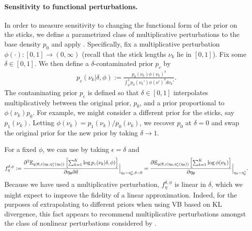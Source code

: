 

\paragraph{Sensitivity to functional perturbations.}
%
In order to measure sensitivity to changing the functional form of the prior on
the sticks, we define a parametrized class of multiplicative perturbations to
the base density $p_{0}$ and apply .
Specifically, fix a multiplicative perturbation $\phi(\cdot): [0, 1] \rightarrow
(0, \infty)$ (recall that the stick lengths $\nu_k$  lie in $[0, 1]$). Fix some
$\delta\in[0, 1]$.  We then define a $\delta$-contaminated prior $p_c$ by
%
\begin{align}
\label{eq:expon_perturb}
	p_c(\nu_k \vert \delta, \phi) :=
  \frac{p_{0}(\nu_k)\phi(\nu_k)^\delta}
       {\int_0^1 p_0(\nu_k')\phi(\nu')^\delta d\nu_k'}.
\end{align}
%
The contaminating prior $p_c$ is defined so that $\delta\in[0, 1]$
interpolates multiplicatively between the original prior, $p_{0}$, and a prior
proportional to $\phi(\nu_k)p_{0}$. For example, we might consider a different
prior for the sticks, say $p_1(\nu_k)$.  Letting $\phi(\nu_k) = p_1(\nu_k) /
p_{0}(\nu_k)$, we recover $p_{0}$ at $\delta = 0$ and swap the original
prior for the new prior by taking $\delta \rightarrow 1$.

For a fixed $\phi$, we can use  by taking
$\epsilon = \delta$ and
%
\begin{align*}
f^{\delta,\phi}_\eta :=
\frac{\partial^2
    \mathbb{E}_{q\left(\theta, z \vert \eta_\theta, \eta_z^{*}(\eta_\theta)\right)} \left[ \sum_{k=1}^K \log p_c(\nu_k \vert \delta, \phi) \right]}
{\partial \eta_\theta \partial \delta}
    \Big\rvert_{\eta_\theta = \eta_\theta^{*}, \delta = 0} =
\frac{\partial
    \mathbb{E}_{q\left(\theta, z \vert \eta_\theta, \eta_z^{*}(\eta_\theta)\right)} \left[ \sum_{k=1}^K  \log\phi(\nu_k) \right]}
{\partial \eta_\theta}
    \Big\rvert_{\eta_\theta = \eta_\theta^{*}}.
\end{align*}
%
Because we have used a multiplicative perturbation, $f^{\delta, \phi}_\eta$
is linear in $\delta$, which we might expect to improve the fidelity of a
linear approximation.
%
Indeed, for the purposes of extrapolating to different priors
when using VB based on KL divergence, this
fact appears to recommend multiplicative perturbations amongst the class of
nonlinear perturbations considered by \citet{gustafson:1996:localposterior}.

